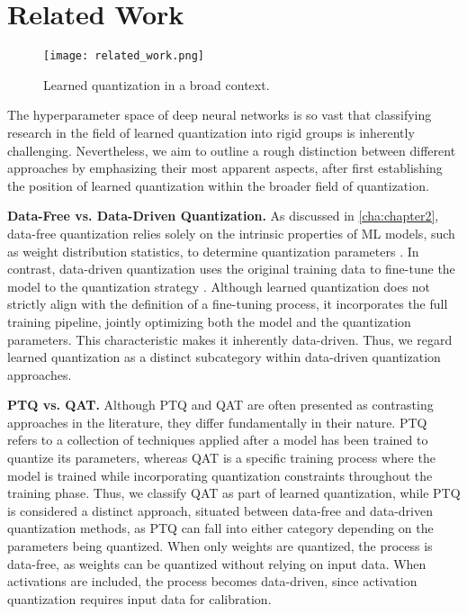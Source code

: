 \chapter{Related Work\label{cha:chapter5}}

\hspace*{1em}
\begin{figure}[b!]
    \centering
    \texttt{[image: related\_work.png]}
    \caption{ Learned quantization in a broad context.}
    \label{fig:related_work}
  \end{figure}
  
The hyperparameter space of deep neural networks is so vast
that classifying research in the field of learned quantization into rigid groups
is inherently challenging.
Nevertheless, we aim to outline a rough distinction
between different approaches by emphasizing their most apparent aspects,
after first establishing the position of learned quantization within the broader field of quantization.

\textbf{Data-Free vs. Data-Driven Quantization.}
As discussed in \cref{cha:chapter2}, 
data-free quantization relies solely on the intrinsic properties of ML models, 
such as weight distribution statistics, to determine quantization parameters \cite{DBLP:conf/iccv/NagelBBW19}. 
In contrast, data-driven quantization uses the original training data to fine-tune the model to the quantization strategy \cite{Edouard2022SPIQ}. 
Although learned quantization does not strictly align with the definition of a fine-tuning process, 
it incorporates the full training pipeline, jointly optimizing both the model and the quantization parameters. 
This characteristic makes it inherently data-driven. 
Thus, we regard learned quantization as a distinct subcategory within data-driven quantization approaches.

\textbf{PTQ vs. QAT.}
Although PTQ and QAT are often presented as contrasting approaches in the literature, 
they differ fundamentally in their nature.
PTQ refers to a collection of techniques applied after a model has been trained to quantize its parameters, 
whereas QAT is a specific training process 
where the model is trained while incorporating quantization 
constraints throughout the training phase.
Thus, we classify QAT as part of learned quantization, 
while PTQ is considered a distinct approach, 
situated between data-free and data-driven quantization methods, 
as PTQ \cite{DBLP:conf/icmcs/ZhuZL18} can fall into either category depending on the parameters being quantized.
When only weights are quantized, the process is data-free, 
as weights can be quantized without relying on input data. 
When activations are included, the process becomes data-driven,
since activation quantization requires input data for calibration.

